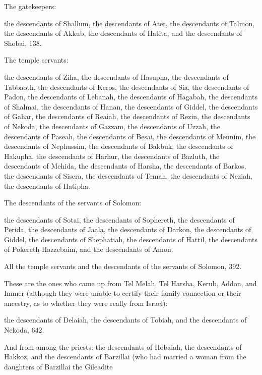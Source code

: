 {\par }{\PP {}The gatekeepers:
\par }{\PP the descendants
of Shallum,
the descendants
of Ater,
the descendants
of Talmon,
the descendants
of Akkub,
the descendants
of Hatita,
and the descendants
of Shobai,
138.
\par }{\PP {}The temple servants:
\par }{\PP the descendants
of Ziha,
the descendants
of Hasupha,
the descendants
of Tabbaoth,
the descendants
of Keros,
the descendants
of Sia,
the descendants
of Padon,
the descendants
of Lebanah,
the descendants of
Hagabah,
the descendants of
Shalmai,
the descendants
of Hanan,
the descendants
of Giddel,
the descendants
of Gahar,
the descendants
of Reaiah,
the descendants of
Rezin,
the descendants
of Nekoda,
the descendants
of Gazzam,
the descendants of
Uzzah,
the descendants
of Paseah,
the descendants
of Besai,
the descendants
of Meunim,
the descendants
of Nephussim,
the descendants
of Bakbuk,
the descendants
of Hakupha,
the descendants
of Harhur,
the descendants
of Bazluth,
the descendants
of Mehida,
the descendants
of Harsha,
the descendants
of Barkos,
the descendants of
Sisera,
the descendants
of Temah,
the descendants
of Neziah,
the descendants
of Hatipha.
\par }{\PP {}The descendants
of the servants
of Solomon:
\par }{\PP the descendants
of Sotai,
the descendants
of Sophereth,
the descendants
of Perida,
the descendants
of Jaala,
the descendants of
Darkon,
the descendants
of Giddel,
the descendants
of Shephatiah,
the descendants of
Hattil,
the descendants of
Pokereth-Hazzebaim,
and the descendants of
Amon.
\par }{\PP {}All
the temple servants
and the descendants
of the servants
of Solomon,
392.
\par }{\PP {}These
are the ones who came up
from Tel Melah,
Tel Harsha,
Kerub,
Addon,
and Immer
(although they were unable
to certify
their family
connection
or
their ancestry,
as to whether
they
were really from Israel):
\par }{\PP {}the descendants
of Delaiah,
the descendants of
Tobiah,
and the descendants
of Nekoda,
642.
\par }{\PP {}And from
among the priests: the descendants
of Hobaiah,
the descendants of
Hakkoz,
and the descendants
of Barzillai
(who had
married
a woman
from the daughters
of Barzillai
the Gileadite
}
